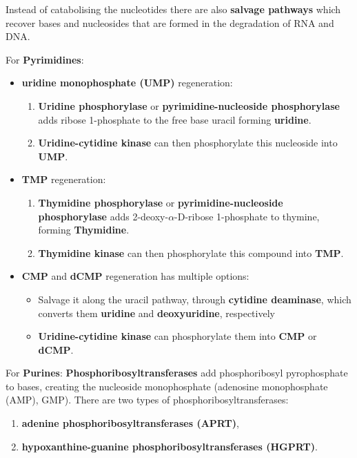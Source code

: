 \documentclass[../main.tex]{subfiles}
\begin{document}
Instead of catabolising the nucleotides there are also \textbf{\gls{salvage pathways}} which recover bases and nucleosides that are formed in the degradation of RNA and DNA. 

For \textbf{Pyrimidines}:
\begin{itemize}
	\item \textbf{\gls{uridine monophosphate (UMP)}} regeneration:
	\begin{enumerate}
		\item \textbf{\gls{Uridine phosphorylase}} or \textbf{\gls{pyrimidine-nucleoside phosphorylase}} adds ribose 1-phosphate to the free base uracil forming \textbf{\gls{uridine}}.
		\item \textbf{\gls{Uridine-cytidine kinase}} can then phosphorylate this nucleoside into \textbf{UMP}.
	\end{enumerate}
	\item \textbf{TMP} regeneration:
	\begin{enumerate}
		\item \textbf{\gls{Thymidine phosphorylase}} or \textbf{\gls{pyrimidine-nucleoside phosphorylase}} adds 2-deoxy-$\alpha$-D-ribose 1-phosphate to thymine, forming \textbf{\gls{Thymidine}}.
		\item \textbf{\gls{Thymidine kinase}} can then phosphorylate this compound into \textbf{TMP}.
	\end{enumerate}
	\item \textbf{CMP} and \textbf{dCMP} regeneration has multiple options: 
	\begin{itemize}
			\item Salvage it along the uracil pathway, through \textbf{\gls{cytidine deaminase}}, which converts them \textbf{\gls{uridine}} and \textbf{\gls{deoxyuridine}}, respectively
			\item \textbf{\gls{Uridine-cytidine kinase}} can phosphorylate them into \textbf{CMP} or \textbf{dCMP}.
	\end{itemize}
\end{itemize}

For \textbf{Purines}: \textbf{\gls{Phosphoribosyltransferases}} add phosphoribosyl pyrophosphate to bases, creating the nucleoside monophosphate (\gls{adenosine monophosphate (AMP)}, GMP). There are two types of phosphoribosyltransferases:
\begin{enumerate}
	\item \textbf{\gls{adenine phosphoribosyltransferases (APRT)}},
	\item \textbf{\gls{hypoxanthine-guanine phosphoribosyltransferases (HGPRT)}}.
\end{enumerate}
\end{document}
